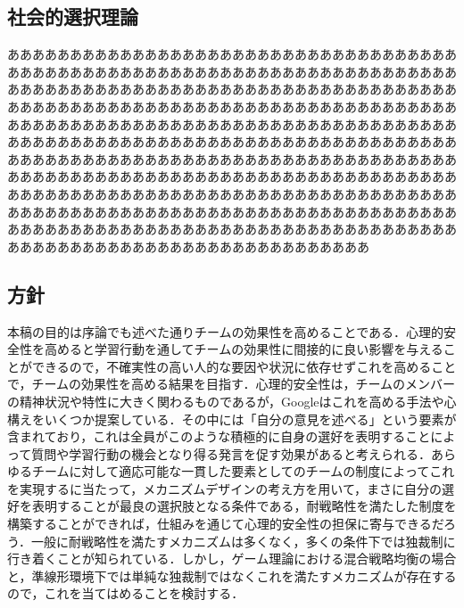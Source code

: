 \documentclass[a4paper, 11pt]{jsarticle}
\begin{document}
\subsection{社会的選択理論}
あああああああああああああああああああああああああああああああああああああああああああああああああああああああああああああああああああああああああああああああああああああああああああああああああああああああああああああああああああああああああああああああああああああああああああああああああああああああああああああああああああああああああああああああああああああああああああああああああああああああああああああああああああああああああああああああああああああああああああああああああああああああああああああああああああああああああああああああああああああああああああああああああああああああああああああああああああああああああああああああああああああああああああああああああああああああああああああああああああああああああああああああああああああああああああああああああああああああああああああああああああああああああああああああああああああああああ

\subsection{方針}
本稿の目的は序論でも述べた通りチームの効果性を高めることである．心理的安全性を高めると学習行動を通してチームの効果性に間接的に良い影響を与えることができるので，不確実性の高い人的な要因や状況に依存せずこれを高めることで，チームの効果性を高める結果を目指す．心理的安全性は，チームのメンバーの精神状況や特性に大きく関わるものであるが，Google\cite{GoogleDoc}はこれを高める手法や心構えをいくつか提案している．その中には「自分の意見を述べる」という要素が含まれており，これは全員がこのような積極的に自身の選好を表明することによって質問や学習行動の機会となり得る発言を促す効果があると考えられる．あらゆるチームに対して適応可能な一貫した要素としてのチームの制度によってこれを実現するに当たって，メカニズムデザインの考え方を用いて，まさに自分の選好を表明することが最良の選択肢となる条件である，耐戦略性を満たした制度を構築することができれば，仕組みを通じて心理的安全性の担保に寄与できるだろう．一般に耐戦略性を満たすメカニズムは多くなく，多くの条件下では独裁制に行き着くことが知られている．しかし，ゲーム理論における混合戦略均衡の場合と，準線形環境下では単純な独裁制ではなくこれを満たすメカニズムが存在するので，これを当てはめることを検討する．
\end{document}
